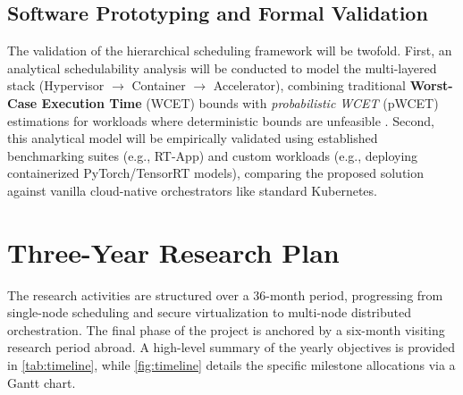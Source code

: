 \documentclass[11pt,a4paper]{article}
\begin{document}
\subsection{Software Prototyping and Formal Validation}
The validation of the hierarchical scheduling framework will be twofold. First, an analytical schedulability analysis will be conducted to model the multi-layered stack (Hypervisor $\rightarrow$ Container $\rightarrow$ Accelerator), combining traditional \textbf{Worst-Case Execution Time} (WCET) bounds with \textit{probabilistic WCET} (pWCET) estimations for workloads where deterministic bounds are unfeasible \cite{reghenzani2020probabilistic}. Second, this analytical model will be empirically validated using established benchmarking suites (e.g., RT-App) and custom workloads (e.g., deploying containerized PyTorch/TensorRT models), comparing the proposed solution against vanilla cloud-native orchestrators like standard Kubernetes.

\section{Three-Year Research Plan}
\label{sec:plan}

The research activities are structured over a 36-month period, progressing from single-node scheduling and secure virtualization to multi-node distributed orchestration. The final phase of the project is anchored by a six-month visiting research period abroad. A high-level summary of the yearly objectives is provided in \cref{tab:timeline}, while \cref{fig:timeline} details the specific milestone allocations via a Gantt chart.
\end{document}
